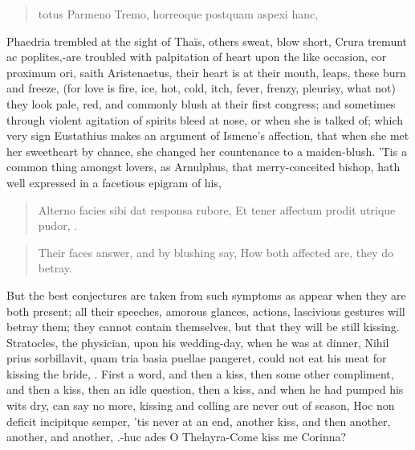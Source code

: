 \begin{latin}
\begin{verse}
totus Parmeno
Tremo, horreoque postquam aspexi hanc,
\end{verse}
\end{latin}

Phaedria trembled at the sight of Thaïs, others sweat, blow short,
Crura tremunt ac poplites,-are troubled with palpitation of heart upon
the like occasion, cor proximum ori, saith Aristenaetus, their
heart is at their mouth, leaps, these burn and freeze, (for love is
fire, ice, hot, cold, itch, fever, frenzy, pleurisy, what not) they
look pale, red, and commonly blush at their first congress; and
sometimes through violent agitation of spirits bleed at nose, or when
she is talked of; which very sign Eustathius makes an argument of
Ismene's affection, that when she met her sweetheart by chance, she
changed her countenance to a maiden-blush. 'Tis a common thing amongst
lovers, as Arnulphus, that merry-conceited bishop, hath well
expressed in a facetious epigram of his,

\begin{latin}
\begin{verse}
Alterno facies sibi dat responsa rubore,
Et tener affectum prodit utrique pudor, \etc{}.
\end{verse}
\end{latin}
\translationrule%
\begin{verse}%
Their faces answer, and by blushing say,
How both affected are, they do betray.
\end{verse}%

But the best conjectures are taken from such symptoms as appear when
they are both present; all their speeches, amorous glances, actions,
lascivious gestures will betray them; they cannot contain themselves,
but that they will be still kissing. Stratocles, the physician,
upon his wedding-day, when he was at dinner, Nihil prius sorbillavit,
quam tria basia puellae pangeret, could not eat his meat for kissing
the bride, \etc{}. First a word, and then a kiss, then some other
compliment, and then a kiss, then an idle question, then a kiss, and
when he had pumped his wits dry, can say no more, kissing and colling
are never out of season, Hoc non deficit incipitque semper, 'tis
never at an end, another kiss, and then another, another, and
another, \etc{}.-huc ades O Thelayra-Come kiss me Corinna?

